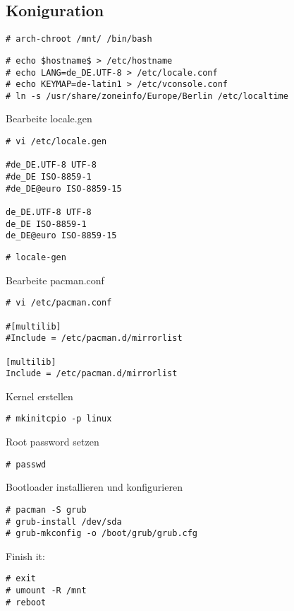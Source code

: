 \subsection{Koniguration}
\label{subsec:config}
\begin{lstlisting}[style=Bash]
# arch-chroot /mnt/ /bin/bash
\end{lstlisting}
\begin{lstlisting}[style=Bash]
# echo $hostname$ > /etc/hostname
# echo LANG=de_DE.UTF-8 > /etc/locale.conf
# echo KEYMAP=de-latin1 > /etc/vconsole.conf
# ln -s /usr/share/zoneinfo/Europe/Berlin /etc/localtime
\end{lstlisting}
Bearbeite locale.gen
\begin{lstlisting}[style=Bash]
# vi /etc/locale.gen

#de_DE.UTF-8 UTF-8
#de_DE ISO-8859-1
#de_DE@euro ISO-8859-15

de_DE.UTF-8 UTF-8
de_DE ISO-8859-1
de_DE@euro ISO-8859-15
\end{lstlisting}
\begin{lstlisting}[style=Bash]
# locale-gen 
\end{lstlisting}
Bearbeite pacman.conf
\begin{lstlisting}[style=Bash]
# vi /etc/pacman.conf

#[multilib]
#Include = /etc/pacman.d/mirrorlist

[multilib]
Include = /etc/pacman.d/mirrorlist
\end{lstlisting}
Kernel erstellen
\begin{lstlisting}[style=Bash]
# mkinitcpio -p linux
\end{lstlisting}
Root password setzen 
\begin{lstlisting}[style=Bash]
# passwd
\end{lstlisting}
Bootloader installieren und konfigurieren
\begin{lstlisting}[style=Bash]
# pacman -S grub 
# grub-install /dev/sda 
# grub-mkconfig -o /boot/grub/grub.cfg 
\end{lstlisting}
Finish it:
\begin{lstlisting}[style=Bash]
# exit 
# umount -R /mnt
# reboot 
\end{lstlisting}

